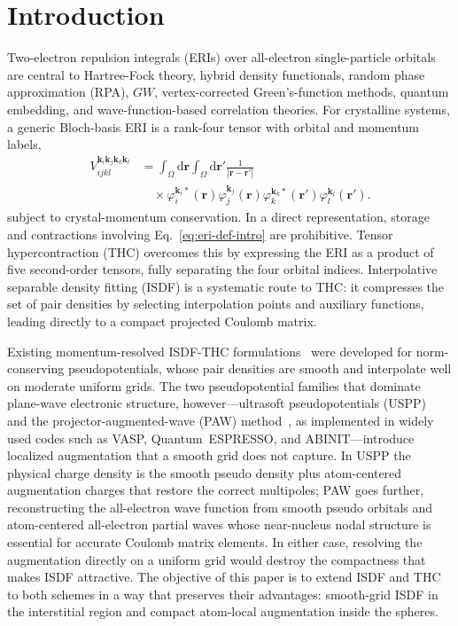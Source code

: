 \documentclass[aps,prb,reprint,superscriptaddress,longbibliography,nofootinbib]{revtex4-2}
\newcommand{\br}{\mathbf r}
\newcommand{\bk}{\mathbf k}
\newcommand{\dd}{\mathrm d}
\newcommand{\cell}{\Omega}
\begin{document}
\maketitle

\section{Introduction}

Two-electron repulsion integrals (ERIs) over all-electron single-particle orbitals are central to Hartree-Fock theory, hybrid density functionals, random phase approximation (RPA), \(GW\), vertex-corrected Green's-function methods, quantum embedding, and wave-function-based correlation theories.  For crystalline systems, a generic Bloch-basis ERI is a rank-four tensor with orbital and momentum labels,
\begin{equation}
\begin{aligned}
V_{ijkl}^{\bk_i\bk_j\bk_k\bk_l}
&=
\int_{\cell}\dd\br\int_{\cell}\dd\br'
\frac{1}{|\br-\br'|}
\\
&\quad\times
\varphi_i^{\bk_i *}(\br)\varphi_j^{\bk_j}(\br)
\varphi_k^{\bk_k *}(\br')\varphi_l^{\bk_l}(\br').
\end{aligned}
\label{eq:eri-def-intro}
\end{equation}
subject to crystal-momentum conservation.  In a direct representation, storage and contractions involving Eq.~\eqref{eq:eri-def-intro} are prohibitive.  Tensor hypercontraction (THC) overcomes this by expressing the ERI as a product of five second-order tensors, fully separating the four orbital indices.  Interpolative separable density fitting (ISDF) is a systematic route to THC: it compresses the set of pair densities by selecting interpolation points and auxiliary functions, leading directly to a compact projected Coulomb matrix.

Existing momentum-resolved ISDF-THC formulations~\cite{YehMoralesRPA,YehMoralesGW} were developed for norm-conserving pseudopotentials, whose pair densities are smooth and interpolate well on moderate uniform grids.  The two pseudopotential families that dominate plane-wave electronic structure, however---ultrasoft pseudopotentials (USPP)~\cite{VanderbiltUSPP} and the projector-augmented-wave (PAW) method~\cite{BlochlPAW,KresseJoubert}, as implemented in widely used codes such as VASP, Quantum~ESPRESSO, and ABINIT---introduce localized augmentation that a smooth grid does not capture.  In USPP the physical charge density is the smooth pseudo density plus atom-centered augmentation charges that restore the correct multipoles; PAW goes further, reconstructing the all-electron wave function from smooth pseudo orbitals and atom-centered all-electron partial waves whose near-nucleus nodal structure is essential for accurate Coulomb matrix elements.  In either case, resolving the augmentation directly on a uniform grid would destroy the compactness that makes ISDF attractive.  The objective of this paper is to extend ISDF and THC to both schemes in a way that preserves their advantages: smooth-grid ISDF in the interstitial region and compact atom-local augmentation inside the spheres.
\end{document}
